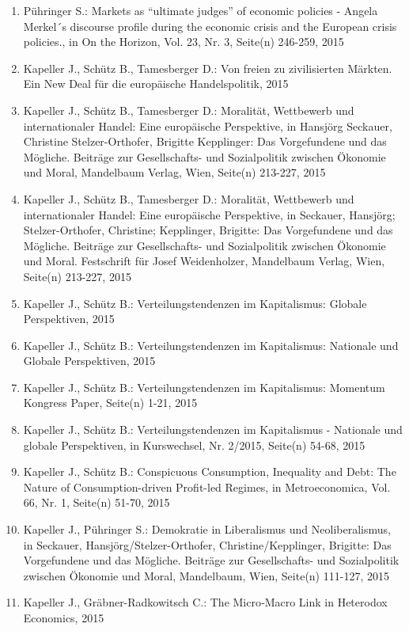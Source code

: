 \begin{enumerate}
	 \item Pühringer S.: Markets as “ultimate judges” of economic policies - Angela Merkel´s discourse profile during the economic crisis and the European crisis policies., in On the Horizon, Vol. 23, Nr. 3, Seite(n) 246-259, 2015
	 \item Kapeller J., Schütz B., Tamesberger D.: Von freien zu zivilisierten Märkten. Ein New Deal für die europäische Handelspolitik, 2015
	 \item Kapeller J., Schütz B., Tamesberger D.: Moralität, Wettbewerb und internationaler Handel: Eine europäische Perspektive, in Hansjörg Seckauer, Christine Stelzer-Orthofer, Brigitte Kepplinger: Das Vorgefundene und das Mögliche. Beiträge zur Gesellschafts- und Sozialpolitik zwischen Ökonomie und Moral, Mandelbaum Verlag, Wien, Seite(n) 213-227, 2015
	 \item Kapeller J., Schütz B., Tamesberger D.: Moralität, Wettbewerb und internationaler Handel: Eine europäische Perspektive, in Seckauer, Hansjörg; Stelzer-Orthofer, Christine; Kepplinger, Brigitte: Das Vorgefundene und das Mögliche. Beiträge zur Gesellschafts- und Sozialpolitik zwischen Ökonomie und Moral. Festschrift für Josef Weidenholzer, Mandelbaum Verlag, Wien, Seite(n) 213-227, 2015
	 \item Kapeller J., Schütz B.: Verteilungstendenzen im Kapitalismus: Globale Perspektiven, 2015
	 \item Kapeller J., Schütz B.: Verteilungstendenzen im Kapitalismus: Nationale und Globale Perspektiven, 2015
	 \item Kapeller J., Schütz B.: Verteilungstendenzen im Kapitalismus: Momentum Kongress Paper, Seite(n) 1-21, 2015
	 \item Kapeller J., Schütz B.: Verteilungstendenzen im Kapitalismus - Nationale und globale Perspektiven, in Kurswechsel, Nr. 2/2015, Seite(n) 54-68, 2015
	 \item Kapeller J., Schütz B.: Conspicuous Consumption, Inequality and Debt: The Nature of Consumption-driven Profit-led Regimes, in Metroeconomica, Vol. 66, Nr. 1, Seite(n) 51-70, 2015
	 \item Kapeller J., Pühringer S.: Demokratie in Liberalismus und Neoliberalismus, in Seckauer, Hansjörg/Stelzer-Orthofer, Christine/Kepplinger, Brigitte: Das Vorgefundene und das Mögliche. Beiträge zur Gesellschafts- und Sozialpolitik zwischen Ökonomie und Moral, Mandelbaum, Wien, Seite(n) 111-127, 2015
	 \item Kapeller J., Gräbner-Radkowitsch C.: The Micro‐Macro Link in Heterodox Economics, 2015

\end{enumerate}
